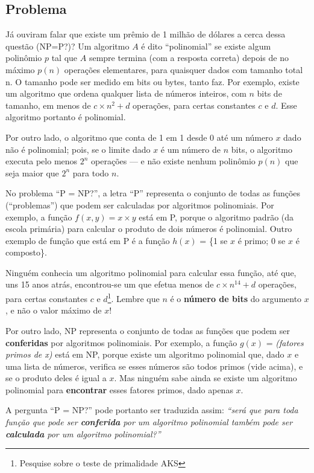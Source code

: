\subsection{Problema}
Já ouviram falar que existe um prêmio de 1 milhão de dólares a cerca dessa questão (NP=P?)?
Um algoritmo $A$ é dito ``polinomial'' se existe algum
polinômio $p$ tal que $A$ sempre termina (com a resposta correta)
depois de no máximo $p(n)$ operações elementares, para quaisquer dados
com tamanho total n.
O tamanho pode ser medido em bits ou bytes, tanto faz.
Por exemplo, existe um algoritmo que ordena qualquer lista de números
inteiros, com $n$ bits de tamanho, em menos de $c \times n^{2} + d$ operações, para
certas constantes $c$ e $d$.
Esse algoritmo portanto é polinomial.

Por outro lado, o algoritmo que conta de 1 em 1 desde 0 até um número
$x$ dado não é polinomial; pois, se o limite dado $x$ é um número de $n$
bits, o algoritmo executa pelo menos $2^n$ operações --- e não existe
nenhum polinômio $p(n)$ que seja maior que $2^n$ para todo $n$.

No problema ``P = NP?'', a letra ``P'' representa o conjunto de todas as
funções (``problemas'') que podem ser calculadas por algoritmos
polinomiais.
Por exemplo, a função $f(x,y) = x \times y$ está em P, porque o
algoritmo padrão (da escola primária) para calcular o produto de dois
números é polinomial.
Outro exemplo de função que está em P é a função $h(x)$ = \{1 se $x$ é
primo; $0$ se $x$ é composto\}.

Ninguém conhecia um algoritmo polinomial para calcular essa função, até que,
uns 15 anos atrás, encontrou-se um que efetua menos
de $c \times n^{14} + d$ operações, para certas
constantes $c$ e $d$\footnote{Pesquise sobre o teste de primalidade AKS}.
Lembre que $n$ é o \textbf{número de bits} do argumento $x$, e não o valor
máximo de $x$!

Por outro lado, NP representa o conjunto de todas as funções que podem
ser \textbf{conferidas} por algoritmos polinomiais.
Por exemplo, a função $g(x)$ = \textit{(fatores primos de x)} está em NP,
porque existe um algoritmo polinomial que, dado $x$ e uma lista de números,
verifica se esses números são todos primos (vide acima), e se o produto deles
é igual a $x$.
Mas ninguém sabe ainda se existe um algoritmo polinomial para
\textbf{encontrar} esses fatores primos, dado apenas $x$.

A pergunta ``P = NP?'' pode portanto ser traduzida assim:
  \textit{``será que para toda função que pode ser \textbf{conferida} por um
  algoritmo polinomial também pode ser \textbf{calculada} por um
  algoritmo polinomial?''}


